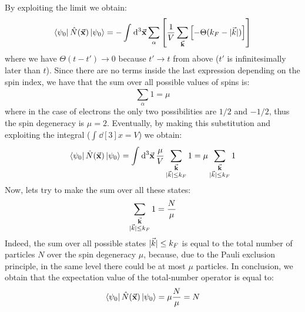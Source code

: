 \documentclass[11pt, a4paper, twoside, openright]{article}
\begin{document}
By exploiting the limit we obtain:
\begin{equation*}
  \bra{\psi _0} \hat{N} (\va{x}) \ket{\psi _0}   = -
  \int_{}^{} \dd[3]{\va{x}} \sum_{\alpha }^{}
  \qty[
   \frac{1}{V}
  \sum_{\va{k}}^{}
  \qty[ - \Theta (k_F- | \vec{k} | )]
   ]
\end{equation*}
where we have \( \Theta (t-t') \rightarrow  0 \) because \( t' \rightarrow t \) from above (\( t' \) is infinitesimally later than \( t \)).
Since there are no terms inside the last expression depending on the spin index, we have that the sum over all possible values of spins is:
\begin{equation*}
  \sum_{\alpha }^{} 1 = \mu
\end{equation*}
where in the case of electrons the only two possibilities are \( 1/2 \) and \( -1/2 \), thus the spin degeneracy is \( \mu =2 \).
Eventually, by making this substitution and exploiting the integral (\( \int_{}^{} \dd[3]{x} = V  \)) we obtain:
\begin{equation*}
  \bra{\psi _0} \hat{N} (\va{x}) \ket{\psi _0}   =
  \int_{}^{} \dd[3]{\va{x}}
  \frac{\mu }{V} \sum_{\substack{ \va{k}\\ | \vec{k} | \le k_F} }^{}  1 =
  \mu \sum_{\substack{ \va{k}\\ | \vec{k} | \le k_F} }^{}  1
\end{equation*}
Now, lets try to make the sum over all these states:
\begin{equation*}
  \sum_{\substack{ \va{k}\\ | \vec{k} | \le k_F} }^{} 1 = \frac{N}{\mu }
\end{equation*}
Indeed, the sum over all possible states \(  | \vec{k} | \le k_F  \) is equal to the total number of particles \( N \) over the spin degeneracy \( \mu  \), because, due to the Pauli exclusion principle, in the same level there could be at most \( \mu  \) particles. In conclusion, we obtain that the expectation value of the total-number operator is equal to:
\begin{equation}
  \bra{\psi _0} \hat{N} (\va{x}) \ket{\psi _0}  =
  \mu \frac{N}{\mu } = N
\end{equation}
\end{document}
